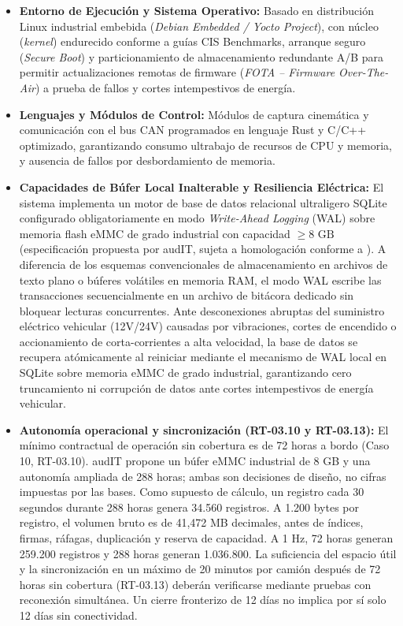 \begin{itemize}
  \item \textbf{Entorno de Ejecución y Sistema Operativo:} Basado en distribución Linux industrial embebida (\textit{Debian Embedded / Yocto Project}), con núcleo (\textit{kernel}) endurecido conforme a guías CIS Benchmarks, arranque seguro (\textit{Secure Boot}) y particionamiento de almacenamiento redundante A/B para permitir actualizaciones remotas de firmware (\textit{FOTA -- Firmware Over-The-Air}) a prueba de fallos y cortes intempestivos de energía.
  \item \textbf{Lenguajes y Módulos de Control:} Módulos de captura cinemática y comunicación con el bus CAN programados en lenguaje Rust y C/C++ optimizado, garantizando consumo ultrabajo de recursos de CPU y memoria, y ausencia de fallos por desbordamiento de memoria.
  \item \textbf{Capacidades de Búfer Local Inalterable y Resiliencia Eléctrica:} El sistema implementa un motor de base de datos relacional ultraligero SQLite configurado obligatoriamente en modo \textit{Write-Ahead Logging} (WAL) sobre memoria flash eMMC de grado industrial con capacidad $\ge 8\text{ GB}$ (especificación propuesta por audIT, sujeta a homologación conforme a ). A diferencia de los esquemas convencionales de almacenamiento en archivos de texto plano o búferes volátiles en memoria RAM, el modo WAL escribe las transacciones secuencialmente en un archivo de bitácora dedicado sin bloquear lecturas concurrentes. Ante desconexiones abruptas del suministro eléctrico vehicular (12V/24V) causadas por vibraciones, cortes de encendido o accionamiento de corta-corrientes a alta velocidad, la base de datos se recupera atómicamente al reiniciar mediante el mecanismo de WAL local en SQLite sobre memoria eMMC de grado industrial, garantizando cero truncamiento ni corrupción de datos ante cortes intempestivos de energía vehicular.
  \item \textbf{Autonomía operacional y sincronización (RT-03.10 y RT-03.13):} El mínimo contractual de operación sin cobertura es de 72 horas a bordo (Caso 10, RT-03.10). audIT propone un búfer eMMC industrial de 8 GB y una autonomía ampliada de 288 horas; ambas son decisiones de diseño, no cifras impuestas por las bases. Como supuesto de cálculo, un registro cada 30 segundos durante 288 horas genera 34.560 registros. A 1.200 bytes por registro, el volumen bruto es de 41,472 MB decimales, antes de índices, firmas, ráfagas, duplicación y reserva de capacidad. A 1 Hz, 72 horas generan 259.200 registros y 288 horas generan 1.036.800. La suficiencia del espacio útil y la sincronización en un máximo de 20 minutos por camión después de 72 horas sin cobertura (RT-03.13) deberán verificarse mediante pruebas con reconexión simultánea. Un cierre fronterizo de 12 días no implica por sí solo 12 días sin conectividad.

\end{itemize}
